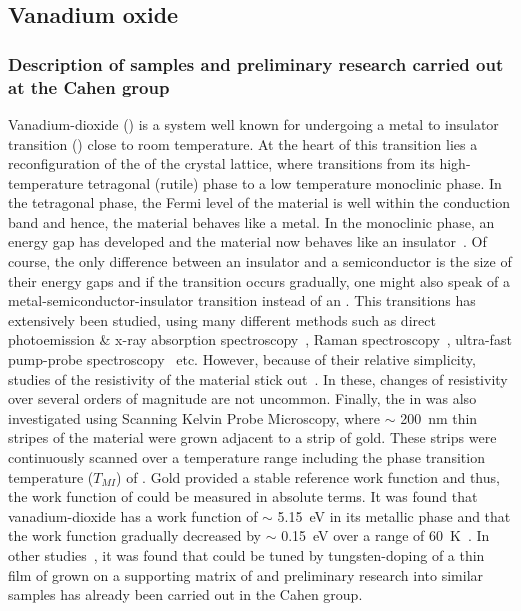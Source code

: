 \subsection{Vanadium oxide}
\label{sec:vox}
\subsubsection{Description of samples and preliminary research carried out at the Cahen group}
Vanadium-dioxide (\vadiox{}) is a system well known for undergoing a metal to insulator transition (\mit{}) close to room temperature. At the heart of this transition lies a reconfiguration of the of the crystal lattice, where \vadiox{} transitions from its high-temperature tetragonal (rutile) phase to a low temperature monoclinic phase. In the tetragonal phase, the Fermi level of the material is well within the conduction band and hence, the material behaves like a metal. In the monoclinic phase, an energy gap has developed and the material now behaves like an insulator~\cite{nakano_gapopen}. Of course, the only difference between an insulator and a semiconductor is the size of their energy gaps and if the transition occurs gradually, one might also speak of a metal-semiconductor-insulator transition instead of an \mit{}. This transitions has extensively been studied, using many different methods such as direct photoemission \& x-ray absorption spectroscopy~\cite{koethe_expstud}, Raman spectroscopy~\cite{radue_raman}, ultra-fast pump-probe spectroscopy~\cite{jensen_expgap} etc. However, because of their relative simplicity, studies of the resistivity of the material stick out~\cite{shibuya_physlet}. In these, changes of resistivity over several orders of magnitude are not uncommon. Finally, the \mit{} in \vadiox{} was also investigated using Scanning Kelvin Probe Microscopy, where $\sim$ \SI{200}{\nano\metre} thin stripes of the material were grown adjacent to a strip of gold. These strips were continuously scanned over a temperature range including the phase transition temperature ($T_{MI}$) of \vadiox{}. Gold provided a stable reference work function and thus, the work function of \vadiox{} could be measured in absolute terms. It was found that vanadium-dioxide has a work function of $\sim$ \SI{5.15}{\electronvolt} in its metallic phase and that the work function gradually decreased by $\sim$ \SI{0.15}{\electronvolt} over a range of \SI{60}{\kelvin}~\cite{ko_kp}. In other studies~\cite{shibuya_physrev}, it was found that \mit{} could be tuned by tungsten-doping of a thin film of \vadiox{} grown on a supporting matrix of \tiox{} and preliminary research into similar samples has already been carried out in the Cahen group.\\
